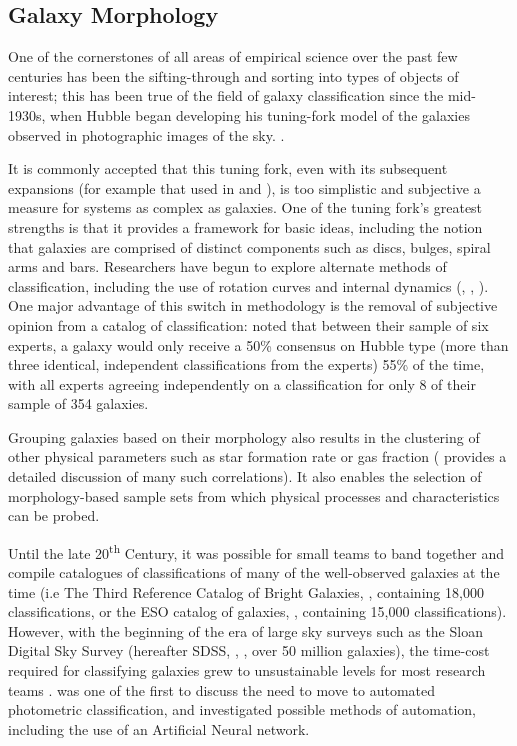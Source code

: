 \documentclass[../main.tex]{subfiles}
\begin{document}
\label{sec:introduction}
\subsection{Galaxy Morphology}
\label{subsec:galaxy-morphology}
One of the cornerstones of all areas of empirical science over the past few centuries has been the sifting-through and sorting into types of objects of interest; this has been true of the field of galaxy classification since the mid-1930s, when Hubble began developing his tuning-fork model of the galaxies observed in photographic images of the sky. \citep{Hubble1936}.

It is commonly accepted that this tuning fork, even with its subsequent expansions (for example that used in \citealt{Sandage1961} and \citealt{deVaucouleurs1991}), is too simplistic and subjective a measure for systems as complex as galaxies. One of the tuning fork's greatest strengths is that it provides a framework for basic ideas, including the notion that galaxies are comprised of distinct components such as discs, bulges, spiral arms and bars. Researchers have begun to explore alternate methods of classification, including the use of rotation curves and internal dynamics (\citealt{2011MNRAS.413..813C}, \citealt{2017MNRAS.469.2539K}, \citealt{Fall2018:1812.06144v1}). One major advantage of this switch in methodology is the removal of subjective opinion from a catalog of classification: \citet{Naim1995:astro-ph/9502078v1} noted that between their sample of six experts, a galaxy would only receive a 50\% consensus on Hubble type (more than three identical, independent classifications from the experts) 55\% of the time, with all experts agreeing independently on a classification for only 8 of their sample of 354 galaxies.

Grouping galaxies based on their morphology also results in the clustering of other physical parameters such as star formation rate or gas fraction (\citealt{RobertsHaynes1994} provides a detailed discussion of many such correlations). It also enables the selection of morphology-based sample sets from which physical processes and characteristics can be probed.

Until the late 20\textsuperscript{th} Century, it was possible for small teams to band together and compile catalogues of classifications of many of the well-observed galaxies at the time (i.e The Third Reference Catalog of Bright Galaxies, \citealt{deVaucouleurs1991}, containing 18,000 classifications, or the ESO catalog of galaxies, \citealt{1989Msngr..56...31L}, containing 15,000 classifications). However, with the beginning of the era of large sky surveys such as the Sloan Digital Sky Survey (hereafter SDSS, \citealt{2017AJ....154...28B}, \citealt{SDSSDR7}, over 50 million galaxies), the time-cost required for classifying galaxies grew to unsustainable levels for most research teams . \citet{Naim1995:astro-ph/9502078v1} was one of the first to discuss the need to move to automated photometric classification, and investigated possible methods of automation, including the use of an Artificial Neural network.
\end{document}
